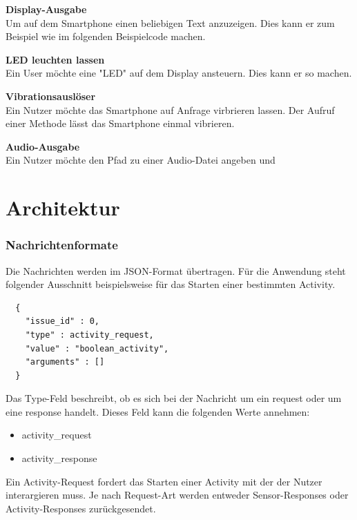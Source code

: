 \documentclass[11pt,a4paper]{report}
\begin{document}
\textbf{Display-Ausgabe}\\
Um auf dem Smartphone einen beliebigen Text anzuzeigen.
Dies kann er zum Beispiel wie im folgenden Beispielcode machen.


\textbf{LED leuchten lassen}\\
Ein User möchte eine "LED" auf dem Display ansteuern.
Dies kann er so machen.


\textbf{Vibrationsauslöser}\\
Ein Nutzer möchte das Smartphone auf Anfrage virbrieren lassen.
Der Aufruf einer Methode lässt das Smartphone einmal vibrieren.


\textbf{Audio-Ausgabe}\\
Ein Nutzer möchte den Pfad zu einer Audio-Datei angeben und





\chapter{Architektur} \label{chap:einfuehrung}

\subsection*{Nachrichtenformate}
Die Nachrichten werden im JSON-Format übertragen.
Für die Anwendung steht folgender Ausschnitt beispielsweise für das Starten einer bestimmten Activity.
\begin{lstlisting}
  {
    "issue_id" : 0,
    "type" : activity_request,
    "value" : "boolean_activity",
    "arguments" : []
  }
\end{lstlisting}
Das Type-Feld beschreibt, ob es sich bei der Nachricht um ein request oder um eine response handelt.
Dieses Feld kann die folgenden Werte annehmen:
\begin{itemize}
  \item activity\_request
  \item activity\_response
\end{itemize}
Ein Activity-Request fordert das Starten einer Activity mit der der Nutzer interargieren muss.
Je nach Request-Art werden entweder Sensor-Responses oder Activity-Responses zurückgesendet.
\end{document}
